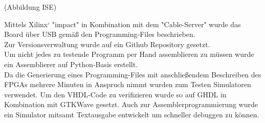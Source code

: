 (Abbildung ISE)



Mittels Xilinx‘ "impact" in Kombination mit dem "Cable-Server" wurde das Board \"uber USB gem\"a{\ss} den Programming-Files beschrieben.\\
Zur Versionsverwaltung wurde auf ein Github Repository gesetzt.\\ 
Um nicht jedes zu testende Programm per Hand assemblieren zu m\"ussen wurde ein Assemblierer auf Python-Basis erstellt.\\
Da die Generierung eines Programming-Files mit anschlie{\ss}endem Beschreiben des FPGAs mehrere Minuten in Anspruch nimmt wurden zum Testen Simulatoren verwendet. Um den VHDL-Code zu verifizieren wurde so auf GHDL in Kombination mit GTKWave gesetzt. Auch zur Assemblerprogrammierung wurde ein Simulator mitsamt Textausgabe entwickelt um schneller debuggen zu k\"onnen.


